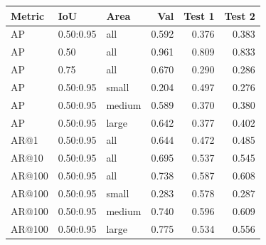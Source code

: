 \begin{tabular}{lllrrr}
\toprule
Metric & IoU & Area & Val & Test 1 & Test 2 \\
\midrule
AP & 0.50:0.95 & all & 0.592 & 0.376 & 0.383 \\
AP & 0.50 & all & 0.961 & 0.809 & 0.833 \\
AP & 0.75 & all & 0.670 & 0.290 & 0.286 \\
AP & 0.50:0.95 & small & 0.204 & 0.497 & 0.276 \\
AP & 0.50:0.95 & medium & 0.589 & 0.370 & 0.380 \\
AP & 0.50:0.95 & large & 0.642 & 0.377 & 0.402 \\
AR@1 & 0.50:0.95 & all & 0.644 & 0.472 & 0.485 \\
AR@10 & 0.50:0.95 & all & 0.695 & 0.537 & 0.545 \\
AR@100 & 0.50:0.95 & all & 0.738 & 0.587 & 0.608 \\
AR@100 & 0.50:0.95 & small & 0.283 & 0.578 & 0.287 \\
AR@100 & 0.50:0.95 & medium & 0.740 & 0.596 & 0.609 \\
AR@100 & 0.50:0.95 & large & 0.775 & 0.534 & 0.556 \\
\bottomrule
\end{tabular}
